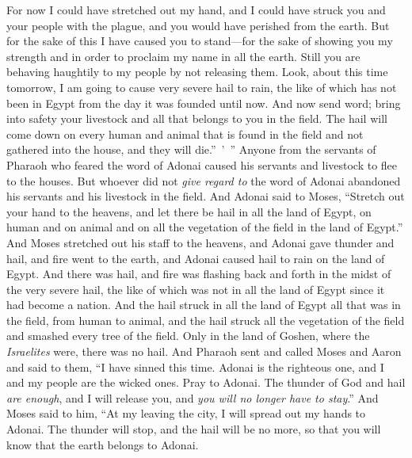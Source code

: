 \begin{biblechapter}
\verse For now I could have stretched out my hand, and I could have struck you and your people with the plague, and you would have perished from the earth.
\verse But for the sake of this I have caused you to stand—for the sake of showing you my strength and in order to proclaim my name in all the earth.
\verse Still you are behaving haughtily to my people by not releasing them.
\verse Look, about this time tomorrow, I am going to cause very severe hail to rain, the like of which has not been in Egypt from the day it was founded until now.
\verse And now send word; bring into safety your livestock and all that belongs to you in the field. The hail will come down on every human and animal that is found in the field and not gathered into the house, and they will die.” ’ ”
\verse Anyone from the servants of Pharaoh who feared the word of Adonai caused his servants and livestock to flee to the houses.
\verse But whoever did not \textit{give regard to} the word of Adonai abandoned his servants and his livestock in the field.
\verse And Adonai said to Moses, “Stretch out your hand to the heavens, and let there be hail in all the land of Egypt, on human and on animal and on all the vegetation of the field in the land of Egypt.”
\verse And Moses stretched out his staff to the heavens, and Adonai gave thunder and hail, and fire went to the earth, and Adonai caused hail to rain on the land of Egypt.
\verse And there was hail, and fire was flashing back and forth in the midst of the very severe hail, the like of which was not in all the land of Egypt since it had become a nation.
\verse And the hail struck in all the land of Egypt all that was in the field, from human to animal, and the hail struck all the vegetation of the field and smashed every tree of the field.
\verse Only in the land of Goshen, where the \textit{Israelites} were, there was no hail.
\verse And Pharaoh sent and called Moses and Aaron and said to them, “I have sinned this time. Adonai is the righteous one, and I and my people are the wicked ones.
\verse Pray to Adonai. The thunder of God and hail \textit{are enough}, and I will release you, and \textit{you will no longer have to stay}.”
\verse And Moses said to him, “At my leaving the city, I will spread out my hands to Adonai. The thunder will stop, and the hail will be no more, so that you will know that the earth belongs to Adonai.

\end{biblechapter}
